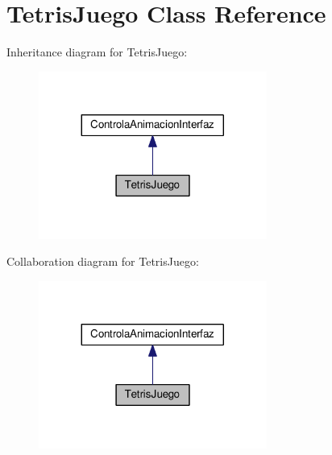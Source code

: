 \hypertarget{class_tetris_juego}{}\section{Tetris\+Juego Class Reference}
\label{class_tetris_juego}


Inheritance diagram for Tetris\+Juego\+:
\nopagebreak
\begin{figure}[H]
\begin{center}
\leavevmode
\includegraphics[width=212pt]{class_tetris_juego__inherit__graph}
\end{center}
\end{figure}


Collaboration diagram for Tetris\+Juego\+:
\nopagebreak
\begin{figure}[H]
\begin{center}
\leavevmode
\includegraphics[width=212pt]{class_tetris_juego__coll__graph}
\end{center}
\end{figure}
